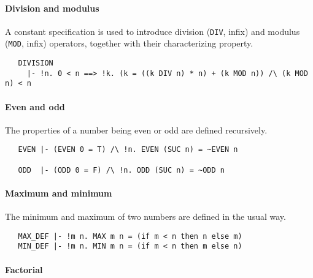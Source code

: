 \paragraph{Division and modulus}

A constant specification is used to introduce division ({\small\verb+DIV+}, infix) and
modulus ({\small\verb+MOD+}, infix) operators, together with their
characterizing property.
\begin{hol}
{\small
\begin{verbatim}
   DIVISION
     |- !n. 0 < n ==> !k. (k = ((k DIV n) * n) + (k MOD n)) /\ (k MOD n) < n
\end{verbatim}
}
\end{hol}

\paragraph{Even and odd}

The properties of a number being even or odd are defined recursively.
%
\begin{hol}
{\small
\begin{verbatim}
   EVEN |- (EVEN 0 = T) /\ !n. EVEN (SUC n) = ~EVEN n

   ODD  |- (ODD 0 = F) /\ !n. ODD (SUC n) = ~ODD n
\end{verbatim}
}
\end{hol}

\paragraph{Maximum and minimum}

The minimum and maximum of two numbers are defined in the usual way.
%
\begin{hol}
{\small
\begin{verbatim}
   MAX_DEF |- !m n. MAX m n = (if m < n then n else m)
   MIN_DEF |- !m n. MIN m n = (if m < n then m else n)
\end{verbatim}
}
\end{hol}

\paragraph{Factorial}

